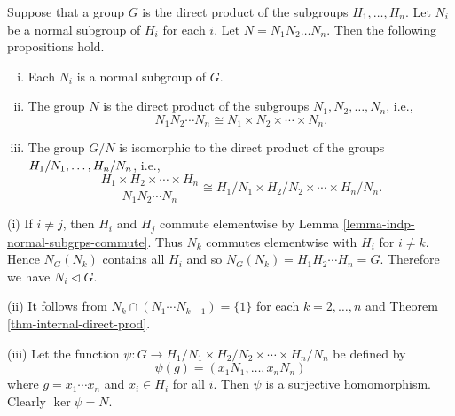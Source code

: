 \begin{proposition} \label{prop-direct-product-normal-subgrp}
	Suppose that a group $G$ is the  direct product of the subgroups $H_1, \dots, H_n$. Let $N_i$ be a normal subgroup of $H_i$ for each $i$. Let $N = N_1 N_2 \dots N_n$. Then the following propositions hold.
	\begin{enumerate}[(i)]
		\item Each $N_i$ is a normal subgroup of $G$.
		\item The group $N$ is the direct product of the subgroups $N_1, N_2, \dots, N_n$, i.e.,
		\begin{equation*}
			N_1N_2\cdots N_n \cong N_1\times N_2\times \cdots \times N_n.
		\end{equation*}
		\item The group $G/N$ is isomorphic to the direct product of the groups $H_1/N_1, \dots,\break H_n/N_n$, i.e.,
		\begin{equation*}
			\frac{H_1\times H_2\times \cdots \times H_n}{N_1N_2\cdots N_n} \cong H_1/N_1\times H_2/N_2\times  \cdots \times H_n/N_n.
		\end{equation*}
	\end{enumerate}
\end{proposition}
\begin{sketch}
	(i) If $i \ne j$, then $H_i$ and $H_j$ commute elementwise by Lemma \ref{lemma-indp-normal-subgrps-commute}. Thus $N_k$ commutes elementwise with $H_i$ for $i\neq k$. Hence $N_G(N_k)$ contains all $H_i$ and so $N_G(N_k) = H_1H_2\cdots H_n = G$. Therefore we have $N_i \lhd G$.
	
	(ii) It follows from $N_k \cap (N_1\cdots N_{k-1}) = \{1\}$ for each $k=2,\dots, n$ and Theorem \ref{thm-internal-direct-prod}.
	
	(iii)  Let the function $\psi:G\rightarrow H_1/N_1\times H_2/N_2\times  \cdots \times H_n/N_n$ be defined by
	\begin{equation*}
		\psi(g) =  (x_1N_1, \ldots, x_nN_n)
	\end{equation*}
	where $g = x_1\cdots x_n$ and $x_i\in H_i$ for all $i$. Then $\psi$ is a surjective homomorphism. Clearly $\ker \psi = N$.
\end{sketch}

